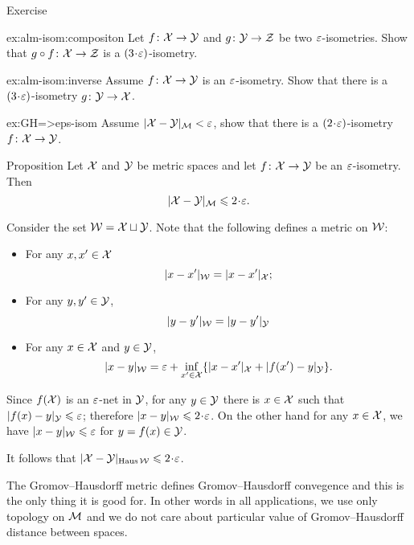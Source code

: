 \begin{thm}{Exercise}\label{ex:alm-isom}

\begin{subthm}{ex:alm-isom:compositon}
Let $f\colon\mathcal{X}\to \mathcal{Y}$ and $g\colon\mathcal{Y}\to \mathcal{Z}$ be two $\varepsilon$-isometries.
Show that $g\circ f\colon \mathcal{X}\to \mathcal{Z}$ is a $(3\cdot\eps)$-isometry.
\end{subthm}

\begin{subthm}{ex:alm-isom:inverse}
Assume $f\: \spc{X} \z\to \spc{Y}$ is an $\varepsilon$-isometry.
Show that there is a $(3\cdot\eps)$-isometry 
$g\colon \mathcal{Y}\to \mathcal{X}$.
\end{subthm}

\begin{subthm}{ex:GH=>eps-isom}
 Assume $|\mathcal{X}-\mathcal{Y}|_{\mathcal{M}}<\varepsilon$, show that there is a $(2\cdot\eps)$-isometry 
$f\colon \mathcal{X}\to \mathcal{Y}$.
\end{subthm}
\end{thm}

\begin{thm}{Proposition}\label{prop:alm-isom=>GH}
Let $\mathcal{X}$ and $\mathcal{Y}$ be metric spaces 
and let $f\colon \mathcal{X}\to \mathcal{Y}$ be an $\varepsilon$-isometry.
Then 
\[|\spc{X}-\spc{Y}|_{\spc{M}}\le 2\cdot \eps.\]
\end{thm}

 Consider the set $\mathcal{W}=\mathcal{X}\sqcup \mathcal{Y}$.
Note that the following defines a metric on $\mathcal{W}$:
\begin{itemize}
\item  For any $x,x'\in \mathcal{X}$
$$|x-x'|_{\mathcal{W}}=|x-x'|_{\mathcal{X}};$$
\item For any $y,y'\in \mathcal{Y}$,
$$|y-y'|_{\mathcal{W}}=|y-y'|_{\mathcal{Y}}$$
\item For any $x\in \mathcal{X}$ and $y\in \mathcal{Y}$,
$$|x-y|_{\mathcal{W}}=\varepsilon+\inf_{x'\in \mathcal{X}}\{|x-x'|_{\mathcal{X}}+|f(x')-y|_{\mathcal{Y}}\}.$$
\end{itemize}

Since $f(\mathcal{X})$ is an $\varepsilon$-net in $\mathcal{Y}$,
for any $y\in \mathcal{Y}$ there is $x\in \mathcal{X}$ such that $|f(x)-y|_{\spc{Y}}\z\le\eps$;
therefore $|x-y|_{\spc{W}}\le 2\cdot\eps$.
On the other hand for any $x\in \mathcal{X}$, we have $|x-y|_{\mathcal{W}}\leqslant\varepsilon$
for $y=f(x)\in \mathcal{Y}$.

It follows that $|\spc{X}-\spc{Y}|_{\Haus\spc{W}}\le 2\cdot\eps$.
\qedsf

The Gromov--Hausdorff metric defines Gromov--Hausdorff convegence
and this is the only thing it is good for.
In other words in all applications, we use only topology on $\mathcal{M}$
and we do not care about particular value of Gromov--Hausdorff distance between spaces.

